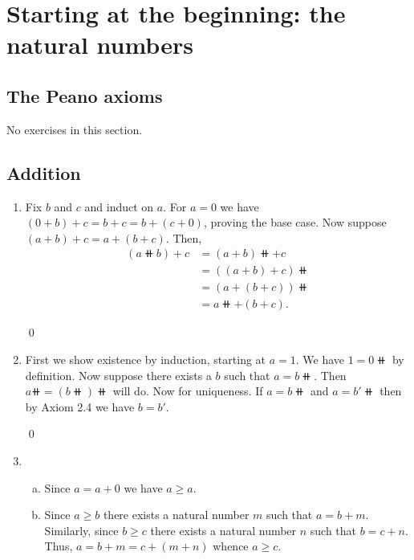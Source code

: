 \chapter{Starting at the beginning: the natural numbers}

\section{The Peano axioms}
No exercises in this section.


\section{Addition}
\begin{enumerate}[Ex. 2.2.1.]
    \item Fix $b$ and $c$ and induct on $a$. For $a = 0$ we have
    $(0 + b) + c = b + c = b + (c + 0)$, proving the base case. Now suppose
    $(a + b) + c = a + (b + c)$. Then,
    \begin{align*}
        (a\doubleplus b) + c &= (a + b)\doubleplus + c \\
                      &= ((a+b)+c)\doubleplus    \\
                      &= (a + (b+c))\doubleplus \\
                      &= a\doubleplus + (b+c).
    \end{align*}

    \qed

    \item First we show existence by induction, starting at $a = 1$. We have 
    $1 = 0\doubleplus$ by definition. Now suppose there exists a $b$ such that 
    $a = b\doubleplus$. Then $a\doubleplus = (b\doubleplus)\doubleplus$ will do. 
    Now for uniqueness. If $a = b\doubleplus$ and $a = b'\doubleplus$ then by 
    Axiom 2.4 we have $b = b'$.

    \qed

    \item
    \begin{enumerate}[(a)]
        \item Since $a = a + 0$ we have $a \geq a$.

        \item Since $a \geq b$ there exists a natural number $m$ such that
        $a = b + m$. Similarly, since $b \geq c$ there exists a natural number
        $n$ such that $b = c + n$. Thus, $a = b + m = c + (m + n)$ whence
        $a \geq c$.


\end{enumerate}
\end{enumerate}
